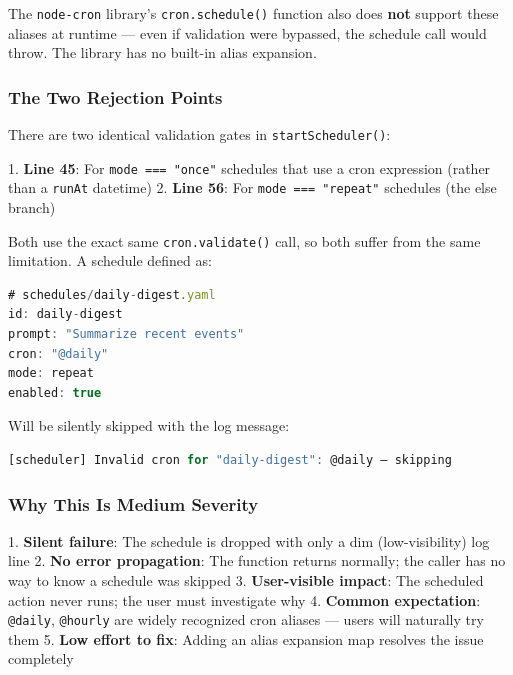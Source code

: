 The \texttt{node-cron} library's \texttt{cron.schedule()} function also does \textbf{not} support these aliases at runtime — even if validation were bypassed, the schedule call would throw. The library has no built-in alias expansion.

\subsubsection*{The Two Rejection Points}

There are two identical validation gates in \texttt{startScheduler()}:

1. \textbf{Line 45}: For \texttt{mode === "once"} schedules that use a cron expression (rather than a \texttt{runAt} datetime)
2. \textbf{Line 56}: For \texttt{mode === "repeat"} schedules (the else branch)

Both use the exact same \texttt{cron.validate()} call, so both suffer from the same limitation. A schedule defined as:



\begin{lstlisting}[language=TypeScript]
# schedules/daily-digest.yaml
id: daily-digest
prompt: "Summarize recent events"
cron: "@daily"
mode: repeat
enabled: true

\end{lstlisting}



Will be silently skipped with the log message:


\begin{lstlisting}[language=TypeScript]
[scheduler] Invalid cron for "daily-digest": @daily — skipping

\end{lstlisting}



\subsubsection*{Why This Is Medium Severity}

1. \textbf{Silent failure}: The schedule is dropped with only a dim (low-visibility) log line
2. \textbf{No error propagation}: The function returns normally; the caller has no way to know a schedule was skipped
3. \textbf{User-visible impact}: The scheduled action never runs; the user must investigate why
4. \textbf{Common expectation}: \texttt{@daily}, \texttt{@hourly} are widely recognized cron aliases — users will naturally try them
5. \textbf{Low effort to fix}: Adding an alias expansion map resolves the issue completely


